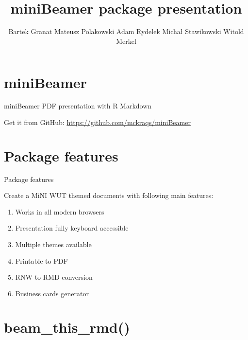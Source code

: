 \documentclass[ignorenonframetext,]{beamer}
\title{miniBeamer package presentation}
\author{Bartek Granat \textbar{} Mateusz Polakowski \textbar{} Adam Rydelek
\textbar{} Michał Stawikowski \textbar{} Witold Merkel}
\date{}
\providecommand{\tightlist}{%
  \setlength{\itemsep}{0pt}\setlength{\parskip}{0pt}}
\begin{document}
\frame{\titlepage}


\section[]{}

\section{miniBeamer}\label{minibeamer}

\begin{frame}{miniBeamer PDF presentation with R Markdown}

Get it from GitHub: \url{https://github.com/mckraqs/miniBeamer}

\end{frame}

\section{Package features}\label{package-features}

\begin{frame}{Package features}

Create a MiNI WUT themed documents with following main features:

\begin{enumerate}
\def\labelenumi{\arabic{enumi}.}
\tightlist
\item
  Works in all modern browsers
\item
  Presentation fully keyboard accessible
\item
  Multiple themes available
\item
  Printable to PDF
\item
  RNW to RMD conversion
\item
  Business cards generator
\end{enumerate}

\end{frame}

\section{beam\_this\_rmd()}\label{beam_this_rmd}
\end{document}
